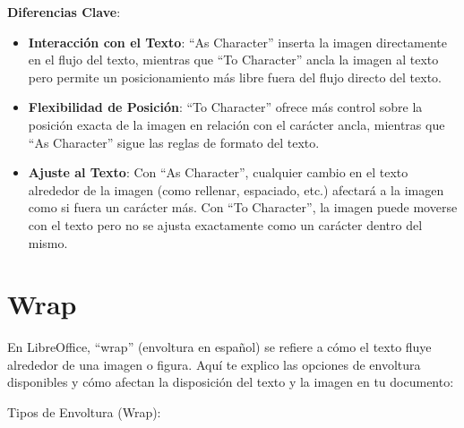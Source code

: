 \documentclass[
  jou,
  floatsintext,
  longtable,
  a4paper,
  nolmodern,
  notxfonts,
  notimes,
  colorlinks=true,linkcolor=blue,citecolor=blue,urlcolor=blue]{apa7}
\begin{document}
\textbf{Diferencias Clave}:

\begin{itemize}
\item
  \textbf{Interacción con el Texto}: ``As Character'' inserta la imagen
  directamente en el flujo del texto, mientras que ``To Character''
  ancla la imagen al texto pero permite un posicionamiento más libre
  fuera del flujo directo del texto.
\item
  \textbf{Flexibilidad de Posición}: ``To Character'' ofrece más control
  sobre la posición exacta de la imagen en relación con el carácter
  ancla, mientras que ``As Character'' sigue las reglas de formato del
  texto.
\item
  \textbf{Ajuste al Texto}: Con ``As Character'', cualquier cambio en el
  texto alrededor de la imagen (como rellenar, espaciado, etc.) afectará
  a la imagen como si fuera un carácter más. Con ``To Character'', la
  imagen puede moverse con el texto pero no se ajusta exactamente como
  un carácter dentro del mismo.
\end{itemize}

\section{Wrap}\label{wrap}

En LibreOffice, ``wrap'' (envoltura en español) se refiere a cómo el
texto fluye alrededor de una imagen o figura. Aquí te explico las
opciones de envoltura disponibles y cómo afectan la disposición del
texto y la imagen en tu documento:

Tipos de Envoltura (Wrap):
\end{document}
